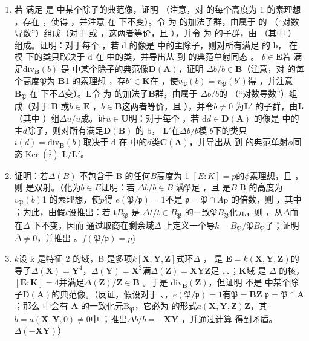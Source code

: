 \begin{enumerate}
\def\labelenumi{(\alph{enumi})}
\item  若  满足  是  中某个除子的典范像，证明 （注意，对  的每个高度为 1 的素理想 ，存在 ，使得 ，并注意  在  下不变）。令  为  的加法子群，由属于  的 （“对数导数”）组成（对于  或 ，这两者等价，且 ），并令  为  的子群，由 （其中 ）组成。证明：对于每个 ，若 d 的像是  中的主除子，则对所有满足  的 b， 在模  下的类只取决于 d 在  中的类，并导出从  到  的典范单射同态 。
  \(b \in \mathbf{E}\)若  满足\(\mathrm{div}_{\mathbf{B}}(b)\)  是  中某个除子的典范像\(\mathbf{D}(\mathbf{A})\)，证明 \(\Delta b / b \in \mathbf{B}\)（注意，对  的每个高度\(\mathfrak{P}\)为 \(\mathbf{B}\)1 的素理想 ，存\(b' \in \mathbf{K}\)在 ，使\(v_{\mathfrak{P}}(b) = v_{\mathfrak{P}}(b')\)得 ，并注意\(\mathbf{B}_{\mathfrak{P}}\)  在  下不\(\Delta\)变）。\(\mathbf{L}\)令  为  的加法子\(\mathbf{B}\)群，由属于  \(\Delta b / b\)的 （“对数导数”）组成（对于 \(\mathbf{B}\) 或\(b \in \mathbf{E}\) ，\(b \in \mathbf{B}\)这两者等价，且 ），并令\(b \neq 0\)  为\(\mathbf{L}'\)  的子群，由\(\mathbf{L}\) （其中 ）组\(\Delta u / u\)成。证\(u \in \mathbf{U}\)明：对于每个 ，若 d\(d \in \mathbf{D}(\mathbf{A})\) 的像是  中的主\(d\)除子，则对所有满足\(\mathbf{D}(\mathbf{B})\)  的 b， \(\mathbf{L}'\)在\(\Delta b / b\)模  \(b\)下的类只\(i(d) = \mathrm{div}_{\mathbf{B}}(b)\)取决于 d 在  中的\(d\)类\(\mathbf{C}(\mathbf{A})\)，并导出从  到  的典范单射\(\phi\)同态\(\operatorname{Ker}(\bar{i})\) \(\mathbf{L} / \mathbf{L}'\)。
\item
  证明：若\(\Delta(B)\)  不包含于 B 的任何\(B\)高度为 1 \([E: K] = p\)的\(\phi\)素理想，且 ，则  是双射。（化为\(b \in E\)证明：若 \(\Delta b / b \in B\) 满\(\mathfrak{P}\)足 ，且  是\(B\) B 的高度为 \(v_{\mathfrak{P}}(b)\)1 的素理想，使\(p\)得  \(e(\mathfrak{P} / \mathfrak{p}) = 1\)不是 \(\mathfrak{p} = \mathfrak{P} \cap A\)p 的倍数，则 ，其中 ；为此，由假\(t\)设推出：若 t\(B_{\mathfrak{P}}\) 是 \(\Delta t / t \in B_{\mathfrak{P}}\) 的一致\(\mathfrak{P}B_{\mathfrak{P}}\)化元，则 ，从\(\Delta\)而  在\(\Delta\)  下不变，因而  通过取商在剩余域\(\overline{\Delta}\)  上定义一个导\(k = B_{\mathfrak{P}} / \mathfrak{P}B_{\mathfrak{P}}\)子；证明 \(\overline{\Delta} \neq 0\)，并推出 。\(f(\mathfrak{P} / \mathfrak{p}) = p\))
\item
  \(k\)设 k 是特征 2 的域，B 是多项\(k[\mathbf{X}, \mathbf{Y}, \mathbf{Z}]\)式环\(\Delta\) ， 是  \(\mathbf{E} = k(\mathbf{X}, \mathbf{Y}, \mathbf{Z})\)的导子\(\Delta(\mathbf{X}) = \mathbf{Y}^4\)，\(\Delta(\mathbf{Y}) = \mathbf{X}^2\)满\(\Delta(\mathbf{Z}) = \mathbf{XYZ}\)足 、、；\(\mathbf{K}\)域  是 \(\Delta\) 的核，\([\mathbf{E} : \mathbf{K}] = 4\)并满足\(\Delta(\mathbf{Z}) / \mathbf{Z} \in \mathbf{B}\) 。于是 \(\mathrm{div}_{\mathbf{B}}(\mathbf{Z})\)，但证明  不是  中某个除子\(\mathrm{D}(\mathbf{A})\)的典范像。（反证，假设对于 、，\(e(\mathfrak{P} / \mathfrak{p}) = 1\)有\(\mathfrak{P} = \mathbf{B}\mathbf{Z}\) \(\mathfrak{p} = \mathfrak{P} \cap \mathbf{A}\)；那么  中会有 \(\mathbf{A}\) 的一致化元\(\mathrm{B}_{\mathfrak{P}}\)，它必为  的形式\(a(\mathbf{X}, \mathbf{Y}, \mathbf{Z})\mathbf{Z}\)，其\(b = a(\mathbf{X}, \mathbf{Y}, 0) \neq 0\)中 ；推出\(\Delta b / b = -\mathbf{X}\mathbf{Y}\) ，并通过计算  得到矛盾。\(\Delta(-\mathbf{X}\mathbf{Y})\)）
\end{enumerate}

